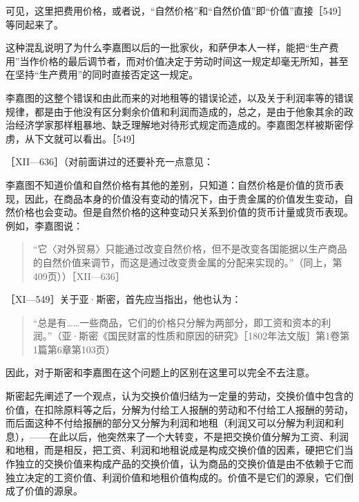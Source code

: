 可见，这里把费用价格，或者说，“自然价格”和“自然价值”即“价值”直接［549］等同起来了。

这种混乱说明了为什么李嘉图以后的一批家伙，和萨伊本人一样，能把“生产费用”当作价格的最后调节者，而对价值决定于劳动时间这一规定却毫无所知，甚至在坚持“生产费用”的同时直接否定这一规定。

李嘉图的这整个错误和由此而来的对地租等的错误论述，以及关于利润率等的错误规律，都是由于他没有区分剩余价值和利润而造成的，总之，是由于他象其余的政治经济学家那样粗暴地、缺乏理解地对待形式规定而造成的。李嘉图怎样被斯密俘虏，从下文就可以看出。［549］


［XII—636］（对前面讲过的还要补充一点意见：

李嘉图不知道价值和自然价格有其他的差别，只知道：自然价格是价值的货币表现，因此，在商品本身的价值没有变动的情况下，由于贵金属的价值发生变动，自然价格也会变动。但是自然价格的这种变动只关系到价值的货币计量或货币表现。例如，李嘉图说：

\begin{quote}{“它〈对外贸易〉只能通过改变自然价格，但不是改变各国能据以生产商品的自然价值来调节，而这是通过改变贵金属的分配来实现的。”（同上，第409页））［XII—636］}\end{quote}



［XI—549］关于亚·斯密，首先应当指出，他也认为：

\begin{quote}{“总是有……一些商品，它们的价格只分解为两部分，即工资和资本的利润。”（亚·斯密《国民财富的性质和原因的研究》［1802年法文版］第1卷第1篇第6章第103页）}\end{quote}

因此，对于斯密和李嘉图在这个问题上的区别在这里可以完全不去注意。

斯密起先阐述了一个观点，认为交换价值归结为一定量的劳动，交换价值中包含的价值，在扣除原料等之后，分解为付给工人报酬的劳动和不付给工人报酬的劳动，而后面这种不付给报酬的部分又分解为利润和地租（利润又可以分解为利润和利息），——在此以后，他突然来了一个大转变，不是把交换价值分解为工资、利润和地租，而是相反，把工资、利润和地租说成是构成交换价值的因素，硬把它们当作独立的交换价值来构成产品的交换价值，认为商品的交换价值是由不依赖于它而独立决定的工资价值、利润价值和地租价值构成的。价值不是它们的源泉，它们倒成了价值的源泉。

